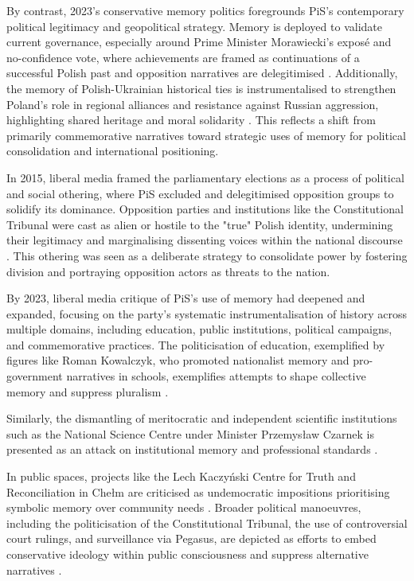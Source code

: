 By contrast, 2023's conservative memory politics foregrounds PiS's contemporary political legitimacy and geopolitical strategy. Memory is deployed to validate current governance, especially around Prime Minister Morawiecki's exposé and no-confidence vote, where achievements are framed as continuations of a successful Polish past and opposition narratives are delegitimised \citep{wpolityce_relacja_2023}. Additionally, the memory of Polish-Ukrainian historical ties is instrumentalised to strengthen Poland's role in regional alliances and resistance against Russian aggression, highlighting shared heritage and moral solidarity \citep{wpolityce_wszystkie_2023}. This reflects a shift from primarily commemorative narratives toward strategic uses of memory for political consolidation and international positioning.

In 2015, liberal media framed the parliamentary elections as a process of political and social othering, where PiS excluded and delegitimised opposition groups to solidify its dominance. Opposition parties and institutions like the Constitutional Tribunal were cast as alien or hostile to the "true" Polish identity, undermining their legitimacy and marginalising dissenting voices within the national discourse \citep{wronski_pis_2015}. This othering was seen as a deliberate strategy to consolidate power by fostering division and portraying opposition actors as threats to the nation.

By 2023, liberal media critique of PiS's use of memory had deepened and expanded, focusing on the party's systematic instrumentalisation of history across multiple domains, including education, public institutions, political campaigns, and commemorative practices. The politicisation of education, exemplified by figures like Roman Kowalczyk, who promoted nationalist memory and pro-government narratives in schools, exemplifies attempts to shape collective memory and suppress pluralism \citep{kowalczyk_pis-owska_2023}.

Similarly, the dismantling of meritocratic and independent scientific institutions such as the National Science Centre under Minister Przemysław Czarnek is presented as an attack on institutional memory and professional standards \citep{blocki_byly_2023}.

In public spaces, projects like the Lech Kaczyński Centre for Truth and Reconciliation in Chełm are criticised as undemocratic impositions prioritising symbolic memory over community needs \citep{brzuszkiewicz_w_2023}. Broader political manoeuvres, including the politicisation of the Constitutional Tribunal, the use of controversial court rulings, and surveillance via Pegasus, are depicted as efforts to embed conservative ideology within public consciousness and suppress alternative narratives \citep{izdebski_nierowne_2023}.

